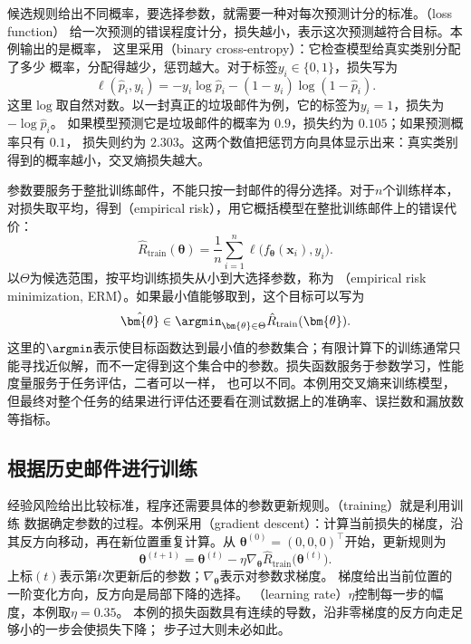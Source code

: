 候选规则给出不同概率，要选择参数，就需要一种对每次预测计分的标准。（loss function）
给一次预测的错误程度计分，损失越小，表示这次预测越符合目标。本例输出的是概率，
这里采用（binary cross-entropy）：它检查模型给真实类别分配了多少
概率，分配得越少，惩罚越大。对于标签$y_i\in\{0,1\}$，损失写为
\begin{equation}
  \ell(\hat{p}_i,y_i)
  =-y_i\log\hat{p}_i-(1-y_i)\log(1-\hat{p}_i).
  \label{eq:binary-cross-entropy}
\end{equation}
这里$\log$取自然对数。以一封真正的垃圾邮件为例，它的标签为$y_i=1$，损失为$-\log\hat{p}_i$。
如果模型预测它是垃圾邮件的概率为 $0.9$，损失约为 $0.105$；如果预测概率只有 $0.1$，
损失则约为 $2.303$。这两个数值把惩罚方向具体显示出来：真实类别得到的概率越小，交叉熵损失越大。

参数要服务于整批训练邮件，不能只按一封邮件的得分选择。对于$n$个训练样本，对损失取平均，得到（empirical risk），用它概括模型在整批训练邮件上的错误代价：
\begin{equation}
  \hat{R}_{\mathrm{train}}(\bm{\theta})
  =\frac{1}{n}\sum_{i=1}^{n}\ell\bigl(f_{\bm{\theta}}(\bm{x}_i),y_i\bigr).
  \label{eq:spam-empirical-risk}
\end{equation}
以$\Theta$为候选范围，按平均训练损失从小到大选择参数，称为
（empirical risk minimization, ERM）。如果最小值能够取到，这个目标可以写为
\begin{equation}
  \hat{\bm{\theta}}
  \in\argmin_{\bm{\theta}\in\Theta}\hat{R}_{\mathrm{train}}(\bm{\theta}).
  \label{eq:spam-erm}
\end{equation}
这里的$\argmin$表示使目标函数达到最小值的参数集合；有限计算下的训练通常只能寻找近似解，而不一定得到这个集合中的参数。损失函数服务于参数学习，性能度量服务于任务评估，二者可以一样，
也可以不同。本例用交叉熵来训练模型，
但最终对整个任务的结果进行评估还要看在测试数据上的准确率、误拦数和漏放数等指标。

\subsection{根据历史邮件进行训练}

经验风险给出比较标准，程序还需要具体的参数更新规则。（training）就是利用训练
数据确定参数的过程。本例采用（gradient descent）：计算当前损失的梯度，沿其反方向移动，再在新位置重复计算。从
$\bm{\theta}^{(0)}=(0,0,0)^{\top}$开始，更新规则为
\begin{equation}
  \bm{\theta}^{(t+1)}
  =\bm{\theta}^{(t)}-\eta\nabla_{\bm{\theta}}
  \hat{R}_{\mathrm{train}}\bigl(\bm{\theta}^{(t)}\bigr).
  \label{eq:spam-gradient-update}
\end{equation}
上标$(t)$表示第$t$次更新后的参数；$\nabla_{\bm{\theta}}$表示对参数求梯度。
梯度给出当前位置的一阶变化方向，反方向是局部下降的选择。
（learning rate）$\eta$控制每一步的幅度，本例取$\eta=0.35$。
本例的损失函数具有连续的导数，沿非零梯度的反方向走足够小的一步会使损失下降；
步子过大则未必如此。

